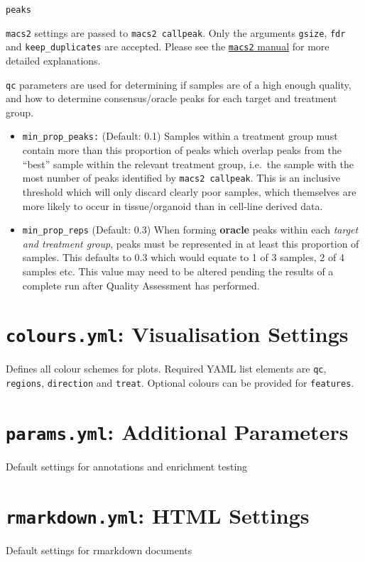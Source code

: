 \documentclass[
]{book}
\providecommand{\tightlist}{%
  \setlength{\itemsep}{0pt}\setlength{\parskip}{0pt}}
\begin{document}
\texttt{peaks}

\texttt{macs2} settings are passed to \texttt{macs2\ callpeak}. Only the arguments \texttt{gsize}, \texttt{fdr} and \texttt{keep\_duplicates} are accepted.
Please see the \href{https://macs3-project.github.io/MACS/}{\texttt{macs2} manual} for more detailed explanations.

\texttt{qc} parameters are used for determining if samples are of a high enough quality, and how to determine consensus/oracle peaks for each target and treatment group.

\begin{itemize}
\tightlist
\item
  \texttt{min\_prop\_peaks:} (Default: 0.1) Samples within a treatment group must contain more than this proportion of peaks which overlap peaks from the ``best'' sample within the relevant treatment group, i.e.~the sample with the most number of peaks identified by \texttt{macs2\ callpeak}. This is an inclusive threshold which will only discard clearly poor samples, which themselves are more likely to occur in tissue/organoid than in cell-line derived data.
\item
  \texttt{min\_prop\_reps} (Default: 0.3) When forming \textbf{oracle} peaks within each \emph{target and treatment group}, peaks must be represented in at least this proportion of samples. This defaults to 0.3 which would equate to 1 of 3 samples, 2 of 4 samples etc. This value may need to be altered pending the results of a complete run after Quality Assessment has performed.
\end{itemize}

\hypertarget{colours.yml-visualisation-settings}{%
\section{\texorpdfstring{\texttt{colours.yml}: Visualisation Settings}{colours.yml: Visualisation Settings}}\label{colours.yml-visualisation-settings}}

Defines all colour schemes for plots.
Required YAML list elements are \texttt{qc}, \texttt{regions}, \texttt{direction} and \texttt{treat}.
Optional colours can be provided for \texttt{features}.

\hypertarget{params.yml-additional-parameters}{%
\section{\texorpdfstring{\texttt{params.yml}: Additional Parameters}{params.yml: Additional Parameters}}\label{params.yml-additional-parameters}}

Default settings for annotations and enrichment testing

\hypertarget{rmarkdown.yml-html-settings}{%
\section{\texorpdfstring{\texttt{rmarkdown.yml}: HTML Settings}{rmarkdown.yml: HTML Settings}}\label{rmarkdown.yml-html-settings}}

Default settings for rmarkdown documents

  
\end{document}
